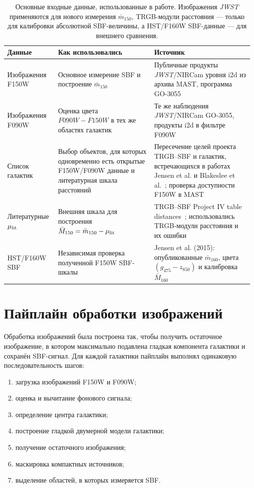 \documentclass[12pt,a4paper]{article}
\begin{document}
\begin{table}[H]
\centering
\small
\begin{tabular}{p{}p{}p{}}
\toprule
Данные & Как использовались & Источник \\
\midrule
Изображения F150W & Основное измерение SBF и построение $\bar{m}_{150}$ & Публичные продукты \textit{JWST}/NIRCam уровня i2d из архива MAST, программа GO-3055~\cite{MAST} \\
Изображения F090W & Оценка цвета $F090W-F150W$ в тех же областях галактик & Те же наблюдения \textit{JWST}/NIRCam GO-3055, продукты i2d в фильтре F090W~\cite{MAST} \\
Список галактик & Выбор объектов, для которых одновременно есть открытые F150W/F090W данные и литературная шкала расстояний & Пересечение целей проекта TRGB--SBF и галактик, встречающихся в работах Jensen et al. и Blakeslee et al.~\cite{Jensen2015,Blakeslee2021,Jensen2025,Chazov2026}; проверка доступности F150W в MAST \\
Литературные $\mu_{\rm lit}$ & Внешняя шкала для построения $\bar{M}_{150}=\bar{m}_{150}-\mu_{\rm lit}$ & TRGB--SBF Project IV table distances~\cite{Chazov2026}; использовались TRGB-модули расстояния и их ошибки \\
HST/F160W SBF & Независимая проверка полученной F150W SBF-шкалы & Jensen et al. (2015): опубликованные $\bar{m}_{160}$, цвета $(g_{475}-z_{850})$ и калибровка $\bar{M}_{160}$~\cite{Jensen2015} \\
\bottomrule
\end{tabular}
\caption{Основные входные данные, использованные в работе. Изображения \textit{JWST} применяются для нового измерения $\bar{m}_{150}$, TRGB-модули расстояния --- только для калибровки абсолютной SBF-величины, а HST/F160W SBF-данные --- для внешнего сравнения.}
\label{tab:data_sources}
\end{table}

\section{Пайплайн обработки изображений}

Обработка изображений была построена так, чтобы получить остаточное изображение, в котором максимально подавлена гладкая компонента галактики и сохранён SBF-сигнал. Для каждой галактики пайплайн выполнял одинаковую последовательность шагов:
\begin{enumerate}
    \item загрузка изображений F150W и F090W;
    \item оценка и вычитание фонового сигнала;
    \item определение центра галактики;
    \item построение гладкой двумерной модели галактики;
    \item получение остаточного изображения;
    \item маскировка компактных источников;
    \item выделение областей, в которых измеряется SBF.
\end{enumerate}
\end{document}
